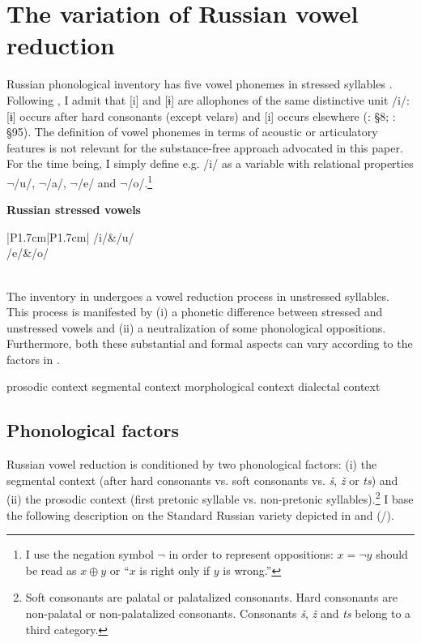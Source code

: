\documentclass[output=paper,
modfonts,
newtxmath,
hidelinks,
]{langscibook}
\begin{document}
\section{The variation of Russian vowel reduction}\label{s2}

Russian phonological inventory has five vowel phonemes in stressed syllables . Following \citet[§19]{Garde1998}, I admit that [i] and [ɨ] are allophones of the same distinctive unit /i/: [ɨ] occurs after hard consonants (except velars) and [i] occurs elsewhere (\citealt{Avanesov1968}: §8; \citealt{Garde1998}: §95). The definition of vowel phonemes in terms of acoustic or articulatory features is not relevant for the substance-free approach advocated in this paper. For the time being, I simply define e.g. /i/ as a variable with relational properties $\neg$/u/, $\neg$/a/, $\neg$/e/ and $\neg$/o/.\footnote{\label{fn1}I use the negation symbol $\neg$ in order to represent oppositions: $x=\neg y$ should be read as $x\oplus y$ or “$x$ is right only if $y$ is wrong.”}

\ea \textbf{Russian stressed vowels}\label{1}\\\medskip
\begin{tabular}{|P{1.7cm}|P{1.7cm}|}
\hline
/i/&/u/\\\hline
/e/&/o/\\\hline
{}\\\hline
\end{tabular}
\z

\noindent The inventory in  undergoes a vowel reduction process in unstressed syllables. This process is manifested by (i) a phonetic difference between stressed and unstressed vowels and (ii) a neutralization of some phonological oppositions. Furthermore, both these substantial and formal aspects can vary according to the factors in .

\ea\label{2}\ea prosodic context
\ex segmental context
\ex morphological context
\ex dialectal context
\z\z

\subsection{Phonological factors}\label{s2.1}

Russian vowel reduction is conditioned by two phonological factors: (i) the segmental context (after hard consonants vs. soft consonants vs. \textit{š}, \textit{ž} or \textit{ts}) and (ii) the prosodic context (first pretonic syllable vs. non-pretonic syllables).\footnote{Soft consonants are palatal or palatalized consonants. Hard consonants are non-palatal or non-palatalized consonants. Consonants \textit{š}, \textit{ž} and \textit{ts} belong to a third category.} I base the following description on the Standard Russian variety depicted in \citet{Avanesov1968} and \citeauthor{Garde1980} (\citeyear{Garde1980}/\citeyear{Garde1998}).
\end{document}
